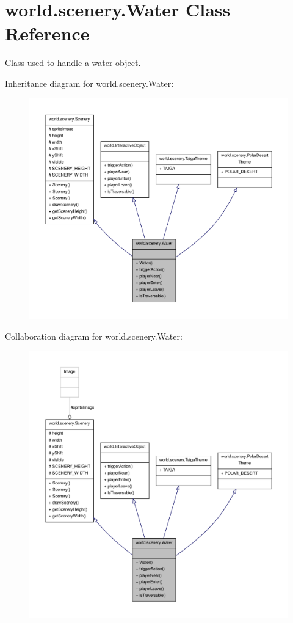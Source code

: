 \hypertarget{a00036}{\section{world.\-scenery.\-Water Class Reference}
\label{a00036}
}


Class used to handle a water object.  




Inheritance diagram for world.\-scenery.\-Water\-:
\nopagebreak
\begin{figure}[H]
\begin{center}
\leavevmode
\includegraphics[width=350pt]{a00197}
\end{center}
\end{figure}


Collaboration diagram for world.\-scenery.\-Water\-:
\nopagebreak
\begin{figure}[H]
\begin{center}
\leavevmode
\includegraphics[width=350pt]{a00198}
\end{center}
\end{figure}
